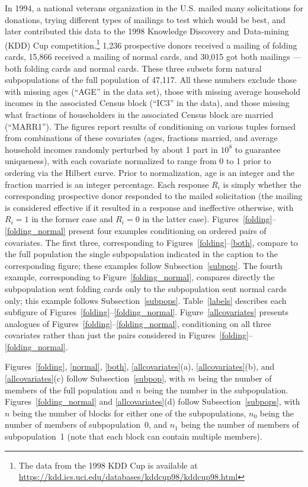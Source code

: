 \documentclass{article}
\begin{document}
In 1994, a national veterans organization in the U.S. mailed many solicitations
for donations, trying different types of mailings to test
which would be best, and later contributed this data
to the 1998 Knowledge Discovery and Data-mining (KDD) Cup
competition.\footnote{The data from the 1998 KDD Cup is available
at \url{https://kdd.ics.uci.edu/databases/kddcup98/kddcup98.html}}
1,236 prospective donors received a mailing of folding cards,
15,866 received a mailing of normal cards,
and 30,015 got both mailings --- both folding cards and normal cards.
These three subsets form natural subpopulations of the full population
of 47,117.
All these numbers exclude those with missing ages (``AGE'' in the data set),
those with missing average household incomes in the associated Census block
(``IC3'' in the data), and those missing what fractions of householders
in the associated Census block are married (``MARR1'').
The figures report results of conditioning on various tuples formed
from combinations of these covariates
(ages, fractions married, and average household incomes
randomly perturbed by about 1 part in $10^8$ to guarantee uniqueness),
with each covariate normalized to range from 0 to 1 prior
to ordering via the Hilbert curve.
Prior to normalization, age is an integer
and the fraction married is an integer percentage.
Each response $R_i$ is simply whether the corresponding prospective donor
responded to the mailed solicitation (the mailing is considered effective
if it resulted in a response and ineffective otherwise,
with $R_i = 1$ in the former case and $R_i = 0$ in the latter case).
Figures~\ref{folding}--\ref{folding_normal} present four examples
conditioning on ordered pairs of covariates.
The first three, corresponding to Figures~\ref{folding}--\ref{both},
compare to the full population the single subpopulation indicated
in the caption to the corresponding figure;
these examples follow Subsection~\ref{subpop}.
The fourth example, corresponding to Figure~\ref{folding_normal},
compares directly the subpopulation sent folding cards only
to the subpopulation sent normal cards only;
this example follows Subsection~\ref{subpops}.
Table~\ref{labels} describes each subfigure
of Figures~\ref{folding}--\ref{folding_normal}.
Figure~\ref{allcovariates} presents analogues
of Figures~\ref{folding}--\ref{folding_normal},
conditioning on all three covariates rather than just the pairs
considered in Figures~\ref{folding}--\ref{folding_normal}.

Figures~\ref{folding}, \ref{normal}, \ref{both}, \ref{allcovariates}(a),
\ref{allcovariates}(b), and \ref{allcovariates}(c)
follow Subsection~\ref{subpop},
with $m$ being the number of members of the full population
and $n$ being the number in the subpopulation.
Figures~\ref{folding_normal} and \ref{allcovariates}(d)
follow Subsection~\ref{subpops},
with $n$ being the number of blocks for either one of the subpopulations,
$n_0$ being the number of members of subpopulation~0,
and $n_1$ being the number of members of subpopulation~1
(note that each block can contain multiple members).
\end{document}
